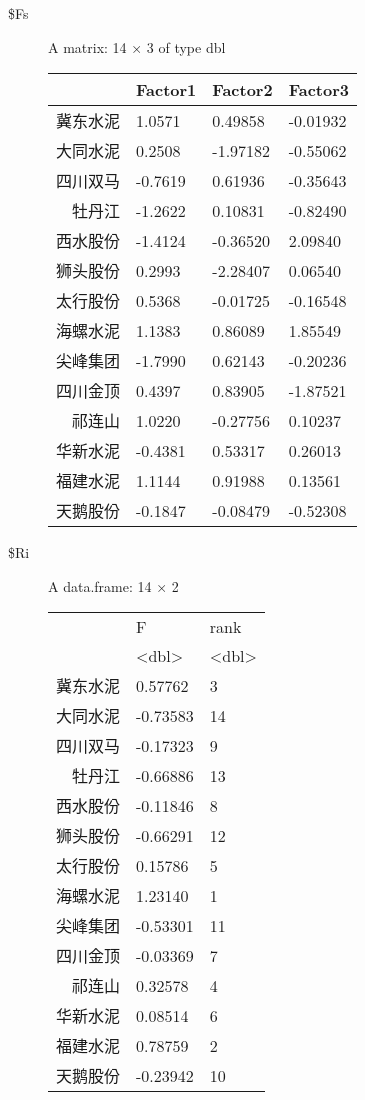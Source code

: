 \documentclass[UTF8,a4paper]{ctexart}
\begin{document}
    \begin{description}
\item[\$Fs] A matrix: 14 × 3 of type dbl
\begin{tabular}{r|lll}
  & Factor1 & Factor2 & Factor3\\
\hline
	冀东水泥 &  1.0571 &  0.49858 & -0.01932\\
	大同水泥 &  0.2508 & -1.97182 & -0.55062\\
	四川双马 & -0.7619 &  0.61936 & -0.35643\\
	牡丹江 & -1.2622 &  0.10831 & -0.82490\\
	西水股份 & -1.4124 & -0.36520 &  2.09840\\
	狮头股份 &  0.2993 & -2.28407 &  0.06540\\
	太行股份 &  0.5368 & -0.01725 & -0.16548\\
	海螺水泥 &  1.1383 &  0.86089 &  1.85549\\
	尖峰集团 & -1.7990 &  0.62143 & -0.20236\\
	四川金顶 &  0.4397 &  0.83905 & -1.87521\\
	祁连山 &  1.0220 & -0.27756 &  0.10237\\
	华新水泥 & -0.4381 &  0.53317 &  0.26013\\
	福建水泥 &  1.1144 &  0.91988 &  0.13561\\
	天鹅股份 & -0.1847 & -0.08479 & -0.52308\\
\end{tabular}

\item[\$Ri] A data.frame: 14 × 2
\begin{tabular}{r|ll}
  & F & rank\\
  & <dbl> & <dbl>\\
\hline
	冀东水泥 &  0.57762 &  3\\
	大同水泥 & -0.73583 & 14\\
	四川双马 & -0.17323 &  9\\
	牡丹江 & -0.66886 & 13\\
	西水股份 & -0.11846 &  8\\
	狮头股份 & -0.66291 & 12\\
	太行股份 &  0.15786 &  5\\
	海螺水泥 &  1.23140 &  1\\
	尖峰集团 & -0.53301 & 11\\
	四川金顶 & -0.03369 &  7\\
	祁连山 &  0.32578 &  4\\
	华新水泥 &  0.08514 &  6\\
	福建水泥 &  0.78759 &  2\\
	天鹅股份 & -0.23942 & 10\\
\end{tabular}

\end{description}
\end{document}
